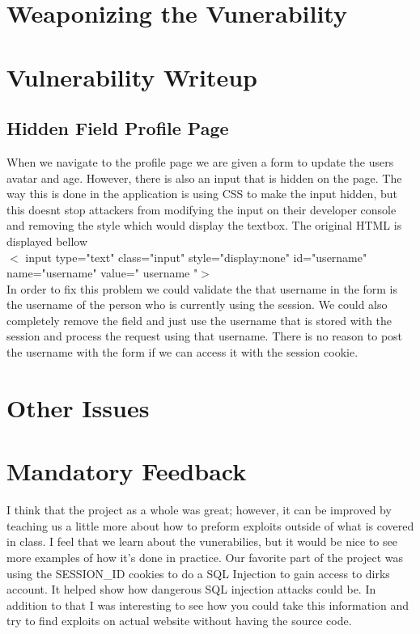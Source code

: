 \documentclass[12pt]{article}
\begin{document}
\maketitle

\section{Weaponizing the Vunerability}

\section{Vulnerability Writeup}
\subsection{Hidden Field Profile Page}
When we navigate to the profile page we are given a form to update the users avatar and age. However, there is also an input that is hidden on the page. The way this is done in the application is using CSS to make the input hidden, but this doesnt stop attackers from modifying the input on their developer console and removing the style which would display the textbox. The original HTML is displayed bellow \\
$<$ input type="text" class="input" style="display:none" id="username" name="username" value="{{ username }}"$>$ \\
In order to fix this problem we could validate the that username in the form is the username of the person who is currently using the session. We could also completely remove the field and just use the username that is stored with the session and process the request using that username. There is no reason to post the username with the form if we can access it with the session cookie.
\subsection{}
\section{Other Issues}

\section{Mandatory Feedback}
I think that the project as a whole was great; however, it can be improved by teaching us a little more about how to preform exploits outside of what is covered in class. I feel that we learn about the vunerabilies, but it would be nice to see more examples of how it's done in practice. Our favorite part of the project was using the SESSION\_ID cookies to do a SQL Injection to gain access to dirks account. It helped show how dangerous SQL injection attacks could be. In addition to that I was interesting to see how you could take this information and try to find exploits on actual website without having the source code.
\end{document}
